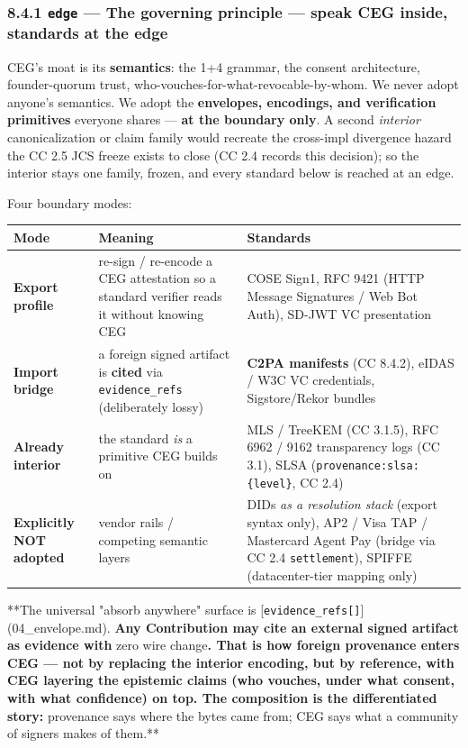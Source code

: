 \documentclass[11pt]{article}
\begin{document}
\subsubsection*{8.4.1 \texttt{edge} — The governing principle — speak CEG inside, standards at the edge}


CEG's moat is its \textbf{semantics}: the 1+4 grammar, the consent architecture, founder-quorum trust, who-vouches-for-what-revocable-by-whom. We never adopt anyone's semantics. We adopt the \textbf{envelopes, encodings, and verification primitives} everyone shares — \textbf{at the boundary only}. A second \textit{interior} canonicalization or claim family would recreate the cross-impl divergence hazard the CC 2.5 JCS freeze exists to close (CC 2.4 records this decision); so the interior stays one family, frozen, and every standard below is reached at an edge.


Four boundary modes:


{\footnotesize
\begin{longtable}{|p{5.33cm}|p{5.33cm}|p{5.33cm}|}\hline
\textbf{Mode} & \textbf{Meaning} & \textbf{Standards} \\ \hline\endhead
\textbf{Export profile} & re-sign / re-encode a CEG attestation so a standard verifier reads it without knowing CEG & COSE Sign1, RFC 9421 (HTTP Message Signatures / Web Bot Auth), SD-JWT VC presentation \\ \hline
\textbf{Import bridge} & a foreign signed artifact is \textbf{cited} via \texttt{evidence\_refs} (deliberately lossy) & \textbf{C2PA manifests} (CC 8.4.2), eIDAS / W3C VC credentials, Sigstore/Rekor bundles \\ \hline
\textbf{Already interior} & the standard \textit{is} a primitive CEG builds on & MLS / TreeKEM (CC 3.1.5), RFC 6962 / 9162 transparency logs (CC 3.1), SLSA (\texttt{provenance:slsa:\{level\}}, CC 2.4) \\ \hline
\textbf{Explicitly NOT adopted} & vendor rails / competing semantic layers & DIDs \textit{as a resolution stack} (export syntax only), AP2 / Visa TAP / Mastercard Agent Pay (bridge via CC 2.4 \texttt{settlement}), SPIFFE (datacenter-tier mapping only) \\ \hline
\end{longtable}}


**The universal "absorb anywhere" surface is [\texttt{evidence\_refs[]}](04\_envelope.md).\textbf{ Any Contribution may cite an external signed artifact as evidence with }zero wire change\textbf{. That is how foreign provenance enters CEG — not by replacing the interior encoding, but by reference, with CEG layering the epistemic claims (who vouches, under what consent, with what confidence) on top. The composition is the differentiated story: }provenance says where the bytes came from; CEG says what a community of signers makes of them.**
\end{document}
